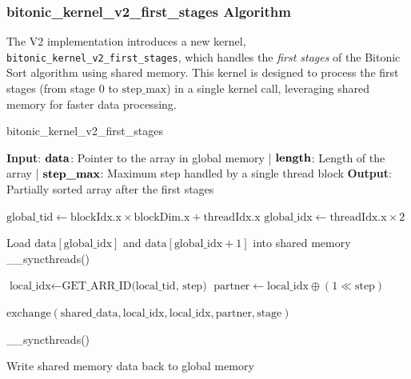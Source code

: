 \documentclass[12pt]{article}
\begin{document}
\subsubsection{bitonic\_kernel\_v2\_first\_stages Algorithm}

The V2 implementation introduces a new kernel, \texttt{bitonic\_kernel\_v2\_first\_stages}, which handles the \textit{first stages} of the Bitonic Sort algorithm using shared memory. This kernel is designed to process the first stages (from stage 0 to \( \text{step\_max} \)) in a single kernel call, leveraging shared memory for faster data processing.

\begin{algorithm}[H]
\caption{bitonic\_kernel\_v2\_first\_stages}\label{alg:v2_first_stages}
\begin{algorithmic}[1]
\Require \textbf{Input}: 
    \( \text{\textbf{data}} \): Pointer to the array in global memory |  
    \( \text{\textbf{length}} \): Length of the array | 
    \( \text{\textbf{step\_max}} \): Maximum step handled by a single thread block
\Ensure \textbf{Output}: Partially sorted array after the first stages

\State \( \text{global\_tid} \gets \text{blockIdx.x} \times \text{blockDim.x} + \text{threadIdx.x} \) 
\State \( \text{global\_idx} \gets \text{threadIdx.x} \times 2 \)

\State Load \( \text{data}[ \text{global\_idx} ] \) and \( \text{data}[ \text{global\_idx} + 1 ] \) into shared memory
\State \_\_syncthreads() 

        \State \( \text{local\_idx} \gets \text{GET\_ARR\_ID(local\_tid, step)} \) 
        \State \( \text{partner} \gets \text{local\_idx} \oplus (1 \ll \text{step}) \) 
        
            
            \State \( \text{exchange}(\text{shared\_data}, \text{local\_idx}, \text{local\_idx}, \text{partner}, \text{stage}) \) 
        \EndIf
        
        \State \_\_syncthreads() 
    \EndFor
\EndFor

\State Write shared memory data back to global memory
\end{algorithmic}
\end{algorithm}
\end{document}
